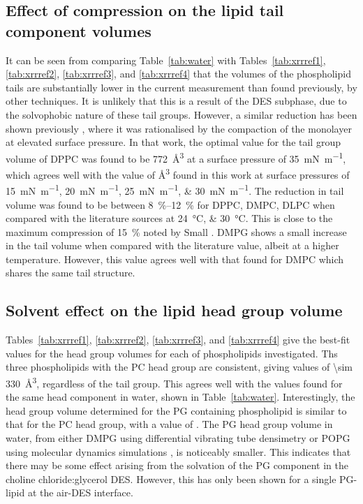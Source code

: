 \subsection{Effect of compression on the lipid tail component volumes}
It can be seen from comparing Table~\ref{tab:water} with Tables~\ref{tab:xrrref1}, \ref{tab:xrrref2}, \ref{tab:xrrref3}, and \ref{tab:xrrref4} that the volumes of the phospholipid tails are substantially lower in the current measurement than found previously, by other techniques.
It is unlikely that this is a result of the DES subphase, due to the solvophobic nature of these tail groups.
However, a similar reduction has been shown previously \cite{campbell_structure_2018}, where it was rationalised by the compaction of the monolayer at elevated surface pressure.
In that work, the optimal value for the tail group volume of DPPC was found to be \SI{772}{\angstrom\cubed} at a surface pressure of \SI{35}{\milli\newton\per\meter}, which agrees well with the value of \si{\angstrom\cubed} found in this work at surface pressures of \SIlist{15;20;25;30}{\milli\newton\per\meter}.
The reduction in tail volume was found to be between \SIrange{8}{12}{\percent} for DPPC, DMPC, DLPC when compared with the literature sources at \SIlist{24;30}{\celsius}.
This is close to the maximum compression of \SI{15}{\percent} noted by Small \cite{small_lateral_1984}.
DMPG shows a small increase in the tail volume when compared with the literature value, albeit at a higher temperature.
However, this value agrees well with that found for DMPC which shares the same tail structure.

\subsection{Solvent effect on the lipid head group volume}
Tables~\ref{tab:xrrref1}, \ref{tab:xrrref2}, \ref{tab:xrrref3}, and \ref{tab:xrrref4} give the best-fit values for the head group volumes for each of phospholipids investigated.
Ths three phospholipids with the PC head group are consistent, giving values of \SI{\sim 330}{\angstrom\cubed}, regardless of the tail group.
This agrees well with the values found for the same head component in water, shown in Table~\ref{tab:water}.
Interestingly, the head group volume determined for the PG containing phospholipid is similar to that for the PC head group, with a value of .
The PG head group volume in water, from either DMPG using differential vibrating tube densimetry \cite{pan_molecular_2012} or POPG using molecular dynamics simulations \cite{kucerka_scattering_2012}, is noticeably smaller.
This indicates that there may be some effect arising from the solvation of the PG component in the choline chloride:glycerol DES.
However, this has only been shown for a single PG-lipid at the air-DES interface.

